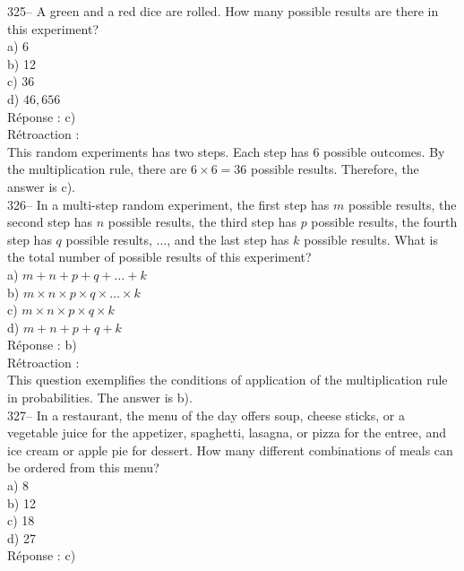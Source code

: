 \documentclass[letterpaper, 12pt]{article}
\begin{document}
325-- A green and a red dice are rolled. How many possible results are there in this experiment?\\

a) 6\\
b) 12\\
c) 36\\
d) $46,656$\\

R\'eponse : c)\\

R\'etroaction : \\
This random experiments has two steps. Each step has 6 possible
outcomes. By the multiplication rule, there are
$6\times6=36$ possible results. Therefore, the answer is c).\\

326-- In a multi-step random experiment, the first step has $m$ possible results, the second step has $n$ possible results, the third step has $p$ possible results, the fourth step has $q$ possible results, $\ldots$, and the last step has $k$ possible results. What is the total number of possible results of this experiment?\\

a) $m+n+p+q+\ldots+k$\\
b) $m\times n\times p\times q\times \ldots \times k$\\
c) $m\times n\times p\times q\times k$\\
d) $m+n+p+q+k$\\

R\'eponse : b)\\

R\'etroaction : \\
This question exemplifies the conditions of application of the multiplication rule in probabilities. The answer is b).\\

327-- In a restaurant, the menu of the day offers soup, cheese sticks, or a vegetable juice for the appetizer, spaghetti,
 lasagna, or pizza for the entree, and ice cream or apple pie for dessert. How many different combinations of meals can be ordered from this menu?\\

a) 8\\
b) 12\\
c) 18\\
d) 27\\

R\'eponse : c)\\
\end{document}
